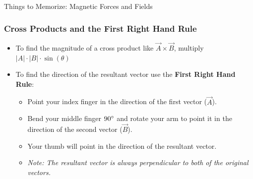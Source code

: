\documentclass[letterpaper, 12pt]{article}
\begin{document}
	


\begin{center}Things to Memorize: Magnetic Forces and Fields
\end{center}

\subsubsection*{Cross Products and the First Right Hand Rule}
\begin{itemize}
	\item To find the magnitude of a cross product like $ \vec{A} \times \vec{B}$, multiply $|A| \cdot |B| \cdot \sin(\theta) $ 
	\item To find the direction of the resultant vector use the \textbf{First Right Hand Rule}:
	\begin{itemize}
		\item Point your index finger in the direction of the first vector ($\vec{A}$).
		\item Bend your middle finger $90 \degree $ and rotate your arm to point it in the direction of the second vector ($\vec{B}$).
		\item Your thumb will point in the direction of the resultant vector.
		\item \textit{Note: The resultant vector is always perpendicular to both of the original vectors.}
	\end{itemize}
\end{itemize}
\end{document}
